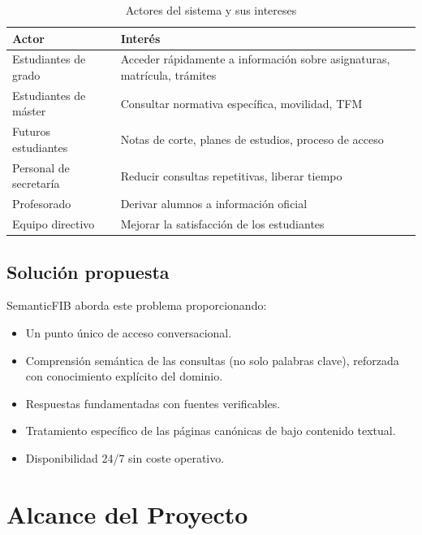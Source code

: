\documentclass[12pt, a4paper, twoside]{report}
\begin{document}
\begin{table}[H]
\centering
\caption{Actores del sistema y sus intereses}
\label{tab:actores}
\begin{tabularx}{\textwidth}{lX}
\toprule
\textbf{Actor} & \textbf{Inter\'es} \\
\midrule
Estudiantes de grado & Acceder r\'apidamente a informaci\'on sobre asignaturas, matr\'icula, tr\'amites \\
Estudiantes de m\'aster & Consultar normativa espec\'ifica, movilidad, TFM \\
Futuros estudiantes & Notas de corte, planes de estudios, proceso de acceso \\
Personal de secretar\'ia & Reducir consultas repetitivas, liberar tiempo \\
Profesorado & Derivar alumnos a informaci\'on oficial \\
Equipo directivo & Mejorar la satisfacci\'on de los estudiantes \\
\bottomrule
\end{tabularx}
\end{table}

\section{Soluci\'on propuesta}

SemanticFIB aborda este problema proporcionando:

\begin{itemize}
  \item Un punto \'unico de acceso conversacional.
  \item Comprensi\'on sem\'antica de las consultas (no solo palabras clave), reforzada con conocimiento expl\'icito del dominio.
  \item Respuestas fundamentadas con fuentes verificables.
  \item Tratamiento espec\'ifico de las p\'aginas can\'onicas de bajo contenido textual.
  \item Disponibilidad 24/7 sin coste operativo.
\end{itemize}


\chapter{Alcance del Proyecto}
\label{ch:alcance}
\end{document}
